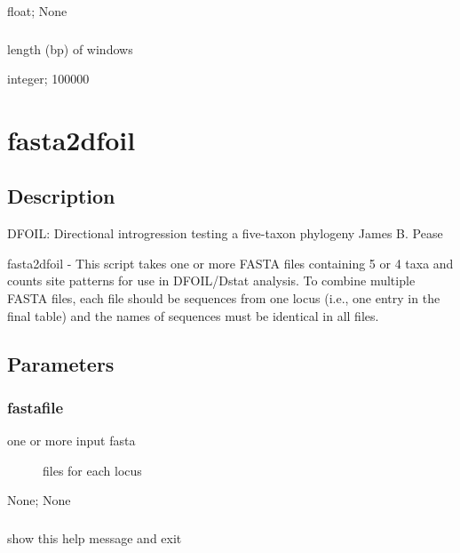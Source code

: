 \documentclass[letterpaper,12pt,english]{sphinxmanual}
\begin{document}
 float;  None


\subsubsection{}
\label{\detokenize{prog_desc:window}}
 length (bp) of windows

 integer;  100000


\section{fasta2dfoil}
\label{\detokenize{prog_desc:fasta2dfoil}}

\subsection{Description}
\label{\detokenize{prog_desc:id7}}
DFOIL: Directional introgression testing a five-taxon phylogeny
James B. Pease

fasta2dfoil -
This script takes one or more FASTA files containing
5 or 4 taxa and counts site patterns for use in DFOIL/Dstat analysis.
To combine multiple FASTA files, each file should be sequences
from one locus (i.e., one entry in the final table) and
the names of sequences must be identical in all files.


\subsection{Parameters}
\label{\detokenize{prog_desc:id8}}

\subsubsection{fastafile}
\label{\detokenize{prog_desc:fastafile}}\begin{description}
\item[{ one or more input fasta}] \leavevmode
files for each locus

\end{description}

 None;  None


\subsubsection{}
\label{\detokenize{prog_desc:id9}}
 show this help message and exit
\end{document}
